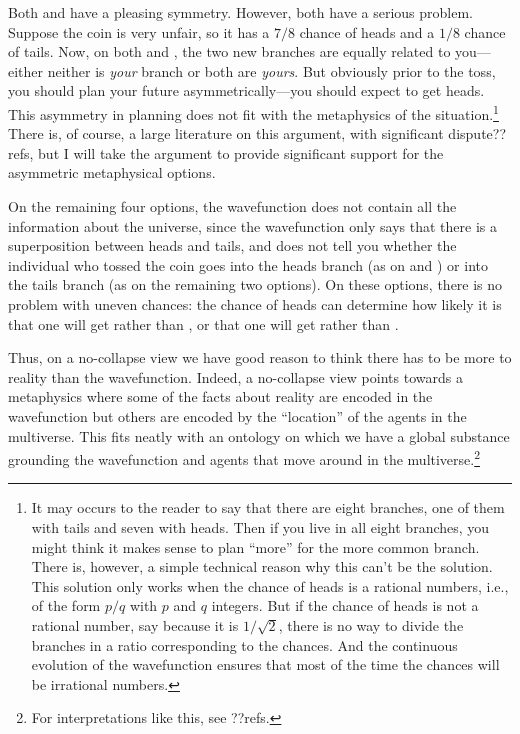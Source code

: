 Both  and  have a pleasing symmetry. However, both have a serious problem.
Suppose the coin is very unfair, so it has a $7/8$ chance of heads and a $1/8$ chance of tails. Now, on both 
 and , the two new branches are equally related to you---either neither is 
\textit{your} branch or both are \textit{yours}. But obviously prior to the toss, you should plan your future 
asymmetrically---you should expect to get heads. This asymmetry in planning does not fit with the metaphysics 
of the situation.\footnote{It may occurs to the reader to say that there are eight branches, one of them with 
tails and seven with heads. Then if you live in all eight branches, you might think it makes sense to plan 
``more'' for the more common branch. There is, however, a simple technical reason why this can't be the solution.
This solution only works when the chance of heads is a rational numbers, i.e., of the form $p/q$ with $p$ and $q$ integers.
But if the chance of heads is not a rational number, say because it is $1/\sqrt{2}$, there is no way to divide 
the branches in a ratio corresponding to the chances. And the continuous evolution of the wavefunction ensures
that most of the time the chances will be irrational numbers.} There is, of course, a large literature on this argument, with significant dispute??refs, but I will take the argument to provide significant support for the asymmetric metaphysical options. 

On the remaining four options, the wavefunction does not contain all the information about the universe, since the wavefunction
only says that there is a superposition between heads and tails, and does not tell you whether the individual who tossed
the coin goes into the heads branch (as on  and ) or into the tails branch (as on
the remaining two options). On these options, there is no problem with uneven chances: the chance of heads can determine 
how likely it is that one will get  rather than , or that one will get 
 rather than .

Thus, on a no-collapse view we have good reason to think there has to be more to reality 
than the wavefunction. Indeed, a no-collapse view points towards a metaphysics where some of the facts about 
reality are encoded in the wavefunction but others are encoded by the ``location'' of the agents in the multiverse.
This fits neatly with an ontology on which we have a global substance grounding the wavefunction and agents that 
move around in the multiverse.\footnote{For interpretations like this, see ??refs.}

